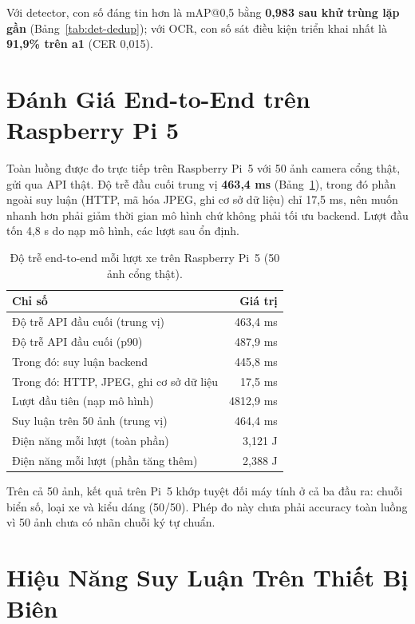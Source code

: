 Với detector, con số đáng tin hơn là mAP@0,5 bằng \textbf{0,983 sau khử trùng lặp gần}
(Bảng~\ref{tab:det-dedup}); với OCR, con số sát điều kiện triển khai nhất là
\textbf{91,9\% trên a1} (CER 0,015).

\section{Đánh Giá End-to-End trên Raspberry Pi 5}
\label{sec:trienkhai-e2e}

Toàn luồng được đo trực tiếp trên Raspberry Pi~5 với 50 ảnh camera cổng thật, gửi qua API
thật. Độ trễ đầu cuối trung vị \textbf{463,4 ms} (Bảng~\ref{tab:e2e-api}), trong đó phần
ngoài suy luận (HTTP, mã hóa JPEG, ghi cơ sở dữ liệu) chỉ 17,5 ms, nên muốn nhanh hơn phải
giảm thời gian mô hình chứ không phải tối ưu backend. Lượt đầu tốn 4,8 s do nạp mô hình, các
lượt sau ổn định.

\begin{table}[htbp]
\centering
\caption{Độ trễ end-to-end mỗi lượt xe trên Raspberry Pi~5 (50 ảnh cổng thật).}

\label{tab:e2e-api}
\begin{tabular}{lr}
\toprule
\textbf{Chỉ số} & \textbf{Giá trị} \\
\midrule
Độ trễ API đầu cuối (trung vị)      & 463,4 ms \\
Độ trễ API đầu cuối (p90)           & 487,9 ms \\
Trong đó: suy luận backend           & 445,8 ms \\
Trong đó: HTTP, JPEG, ghi cơ sở dữ liệu & 17,5 ms \\
Lượt đầu tiên (nạp mô hình)          & 4812,9 ms \\
Suy luận trên 50 ảnh (trung vị)      & 464,4 ms \\
Điện năng mỗi lượt (toàn phần)       & 3,121 J \\
Điện năng mỗi lượt (phần tăng thêm)  & 2,388 J \\
\bottomrule
\end{tabular}
\end{table}

Trên cả 50 ảnh, kết quả trên Pi~5 khớp tuyệt đối máy tính ở cả ba đầu ra: chuỗi biển số,
loại xe và kiểu dáng (50/50). Phép đo này chưa phải accuracy toàn luồng vì 50 ảnh chưa có nhãn
chuỗi ký tự chuẩn.

\section{Hiệu Năng Suy Luận Trên Thiết Bị Biên}
\label{sec:trienkhai-hieunang}

